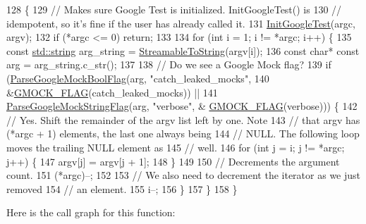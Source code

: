 \begin{DoxyCode}
128                                                     \{
129   \textcolor{comment}{// Makes sure Google Test is initialized.  InitGoogleTest() is}
130   \textcolor{comment}{// idempotent, so it's fine if the user has already called it.}
131   \hyperlink{namespacetesting_afd726ae08c9bd16dc52f78c822d9946b}{InitGoogleTest}(argc, argv);
132   \textcolor{keywordflow}{if} (*argc <= 0) \textcolor{keywordflow}{return};
133 
134   \textcolor{keywordflow}{for} (\textcolor{keywordtype}{int} i = 1; i != *argc; i++) \{
135     \textcolor{keyword}{const} \hyperlink{namespacetesting_1_1internal_a8e8ff5b11e64078831112677156cb111}{std::string} arg\_string = \hyperlink{namespacetesting_1_1internal_aad4beed95d0846e6ffc5da0978ef3bb9}{StreamableToString}(argv[i]);
136     \textcolor{keyword}{const} \textcolor{keywordtype}{char}* \textcolor{keyword}{const} arg = arg\_string.c\_str();
137 
138     \textcolor{comment}{// Do we see a Google Mock flag?}
139     \textcolor{keywordflow}{if} (\hyperlink{namespacetesting_1_1internal_a137bff8177d6158f59ab4ce603577293}{ParseGoogleMockBoolFlag}(arg, \textcolor{stringliteral}{"catch\_leaked\_mocks"},
140                                 &\hyperlink{gmock-port_8h_ad7119adfef06be5e7b1551633f5a1436}{GMOCK\_FLAG}(catch\_leaked\_mocks)) ||
141         \hyperlink{namespacetesting_1_1internal_afb359266feb817d9943854b76574817d}{ParseGoogleMockStringFlag}(arg, \textcolor{stringliteral}{"verbose"}, &
      \hyperlink{gmock-port_8h_ad7119adfef06be5e7b1551633f5a1436}{GMOCK\_FLAG}(verbose))) \{
142       \textcolor{comment}{// Yes.  Shift the remainder of the argv list left by one.  Note}
143       \textcolor{comment}{// that argv has (*argc + 1) elements, the last one always being}
144       \textcolor{comment}{// NULL.  The following loop moves the trailing NULL element as}
145       \textcolor{comment}{// well.}
146       \textcolor{keywordflow}{for} (\textcolor{keywordtype}{int} j = i; j != *argc; j++) \{
147         argv[j] = argv[j + 1];
148       \}
149 
150       \textcolor{comment}{// Decrements the argument count.}
151       (*argc)--;
152 
153       \textcolor{comment}{// We also need to decrement the iterator as we just removed}
154       \textcolor{comment}{// an element.}
155       i--;
156     \}
157   \}
158 \}
\end{DoxyCode}
Here is the call graph for this function\+:
\nopagebreak
